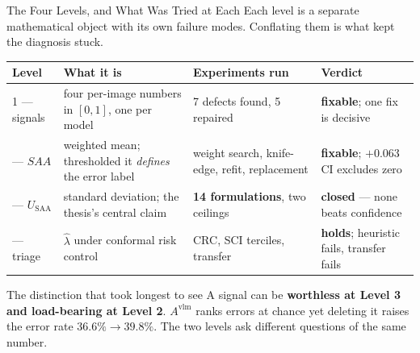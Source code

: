 \documentclass[aspectratio=169,11pt]{beamer}
\begin{document}
\begin{frame}{The Four Levels, and What Was Tried at Each}
\small
Each level is a separate mathematical object with its own failure modes. Conflating them is what kept the diagnosis stuck.
\vspace{1mm}
\begin{center}
\scriptsize
\tiny
\begin{tabular}{@{}p{1.4cm} p{3.3cm} p{3.1cm} p{3.3cm}@{}}
\toprule
\textbf{Level} & \textbf{What it is} & \textbf{Experiments run} & \textbf{Verdict} \\
\midrule
1 --- signals & four per-image numbers in $[0,1]$, one per model & 7 defects found, 5 repaired & \textbf{fixable}; one fix is decisive \\
\addlinespace
2 --- $SAA$ & weighted mean; thresholded it \emph{defines} the error label & weight search, knife-edge, refit, replacement & \textbf{fixable}; $+0.063$ CI excludes zero \\
\addlinespace
3 --- $U_{\text{SAA}}$ & standard deviation; the thesis's central claim & \textbf{14 formulations}, two ceilings & \textbf{closed} --- none beats confidence \\
\addlinespace
4 --- triage & $\hat\lambda$ under conformal risk control & CRC, SCI terciles, transfer & \textbf{holds}; heuristic fails, transfer fails \\
\bottomrule
\end{tabular}
\end{center}
\vspace{1mm}
\begin{alertblock}{\small The distinction that took longest to see}
\footnotesize A signal can be \textbf{worthless at Level 3 and load-bearing at Level 2}. $A^{\text{vlm}}$ ranks errors at chance yet deleting it raises the error rate $36.6\% \to 39.8\%$. The two levels ask different questions of the same number.
\end{alertblock}
\end{frame}
\end{document}
